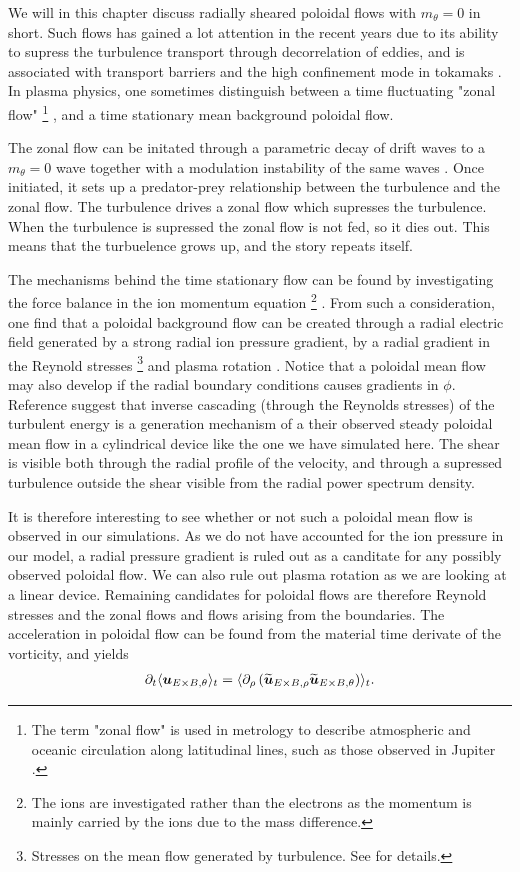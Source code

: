 We will in this chapter discuss radially sheared poloidal flows with $m_\theta = 0$ in short.
Such flows has gained a lot attention in the recent years due to its ability to supress the turbulence transport through decorrelation of eddies, and is associated with transport barriers and the high confinement mode in tokamaks \cite{Terry2000,Diamond2005a,Viezzer2012Phd}.
In plasma physics, one sometimes distinguish between a time fluctuating "zonal flow"%
\footnote{The term "zonal flow" is used in metrology to describe atmospheric and oceanic circulation along latitudinal lines, such as those observed in Jupiter \cite{Limaye1986}.}%
, and a time stationary mean background poloidal flow.

The zonal flow can be initated through a parametric decay of drift waves to a $m_\theta=0$ wave together with a modulation instability of the same waves \cite{Diamond2005a}.
Once initiated, it sets up a predator-prey relationship between the turbulence and the zonal flow.
The turbulence drives a zonal flow which supresses the turbulence.
When the turbulence is supressed the zonal flow is not fed, so it dies out.
This means that the turbuelence grows up, and the story repeats itself.

The mechanisms behind the time stationary flow can be found by investigating the force balance in the ion momentum equation%
\footnote{The ions are investigated rather than the electrons as the momentum is mainly carried by the ions due to the mass difference.}%
%
.
From such a consideration, one find that a poloidal background flow can be created through a radial electric field generated by a strong radial ion pressure gradient, by a radial gradient in the Reynold stresses
\footnote{Stresses on the mean flow generated by turbulence.
See \cite{Kundu2010book} for details.}%
and plasma rotation \cite{Terry2000}.
Notice that a poloidal mean flow may also develop if the radial boundary conditions causes gradients in $\phi$.
Reference \cite{Tynan2006a} suggest that inverse cascading (through the Reynolds stresses) of the turbulent energy is a generation mechanism of a their observed steady poloidal mean flow in a cylindrical device like the one we have simulated here.
The shear is visible both through the radial profile of the velocity, and through a supressed turbulence outside the shear visible from the radial power spectrum density.

It is therefore interesting to see whether or not such a poloidal mean flow is observed in our simulations.
As we do not have accounted for the ion pressure in our model, a radial pressure gradient is ruled out as a canditate for any possibly observed poloidal flow.
We can also rule out plasma rotation as we are looking at a linear device.
Remaining candidates for poloidal flows are therefore Reynold stresses and the zonal flows and flows arising from the boundaries.
The acceleration in poloidal flow can be found from the material time derivate of the vorticity, and yields \cite{Diamond1991}
%
\begin{align*}
    \partial_t \langle{\boldsymbol{u}_{E\times B,\theta}}\rangle_t = \langle{\partial_\rho\left(\widetilde{ \boldsymbol{u}}_{E\times B,\rho}\widetilde{ \boldsymbol{u}}_{E\times B,\theta}\right)}\rangle_t.
\end{align*}
%

